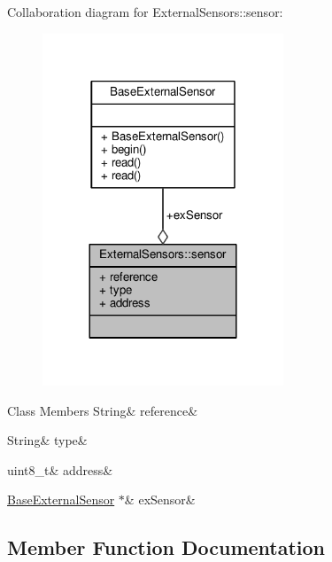 Collaboration diagram for External\+Sensors\+:\+:sensor\+:
\nopagebreak
\begin{figure}[H]
\begin{center}
\leavevmode
\includegraphics[width=204pt]{d5/db6/struct_external_sensors_1_1sensor__coll__graph}
\end{center}
\end{figure}
\begin{DoxyFields}{Class Members}
\mbox{\label{class_external_sensors_afed5bdfd49732202a368b600cb8396fe}} 
String&
reference&
\\
\hline

\mbox{\label{class_external_sensors_a6acfdb02c742c2110d7bd2b5d9fce9e7}} 
String&
type&
\\
\hline

\mbox{\label{class_external_sensors_a8d70ca58524521ed054fc6b81eb58d34}} 
uint8\_t&
address&
\\
\hline

\mbox{\label{class_external_sensors_a9bca150fd468b8d0e090e6d72c5c2b48}} 
\hyperlink{class_base_external_sensor}{BaseExternalSensor} $\ast$&
exSensor&
\\
\hline

\end{DoxyFields}


\subsection{Member Function Documentation}
\mbox{\label{class_external_sensors_a58ede0d786a86417254708870f04a21e}} 
